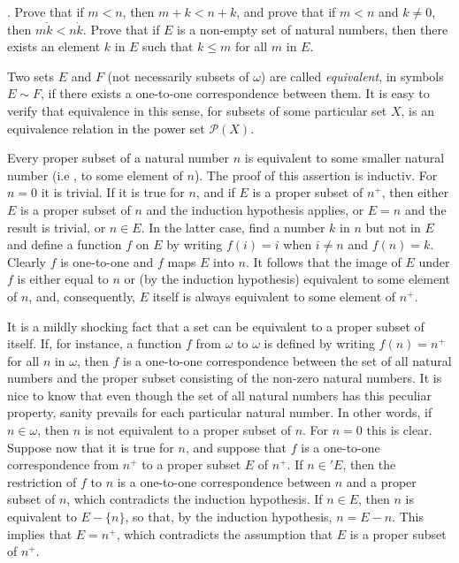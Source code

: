 \begin{exercise}. Prove that if $m < n$, then $m + k < n + k$, and prove that if $m < n$ and $k \neq 0$, then $m \dot k <n \dot k$. Prove that if $E$ is a non-empty set of natural numbers, then there exists an element $k$ in $E$ such that $k \le m$ for all $m$ in $E$. 
\end{exercise}

Two sets $E$ and $F$ (not necessarily subsets of $\omega$) are called \textit{equivalent}, in symbols $E \sim F$, if there exists a one-to-one correspondence between them. It is easy to verify that equivalence in this sense, for subsets of some particular set $X$, is an equivalence relation in the power set $\mathcal{P}(X)$.

Every proper subset of a natural number $n$ is equivalent to some smaller natural number (i.e , to some element of $n$). The proof of this assertion is inductiv. For $n = 0$ it is trivial. If it is true for $n$, and if $E$ is a proper subset of $n^{+}$, then either $E$ is a proper subset of $n$ and the induction hypothesis applies, or $E = n$ and the result is trivial, or $n \in E$. In the latter case, find a number $k$ in $n$ but not in $E$ and define a function $f$ on $E$ by writing $f(i) = i$ when $i \neq n$ and $f(n) = k$. Clearly $f$ is one-to-one and $f$ maps $E$ into $n$. It follows that the image of $E$ under $f$ is either equal to $n$ or (by the induction hypothesis) equivalent to some element of $n$, and, consequently, $E$ itself is always equivalent to some element of $n^{+}$. 

It is a mildly shocking fact that a set can be equivalent to a proper subset of itself. If, for instance, a function $f$ from $\omega$ to $\omega$ is defined by writing $f(n) = n^{+}$ for all $n$ in $\omega$, then $f$ is a one-to-one correspondence between the set of all natural numbers and the proper subset consisting of the non-zero natural numbers. It is nice to know that even though the set of all natural numbers has this peculiar property, sanity prevails for each particular natural number. In other words, if $n \in \omega$, then $n$ is not equivalent to a proper subset of $n$. For $n = 0$ this is clear. Suppose now that it is true for $n$, and suppose that $f$ is a one-to-one correspondence from $n^{+}$ to a proper subset $E$ of $n^{+}$. If $n \in ' E$, then the restriction of $f$ to $n$ is a one-to-one correspondence between $n$ and a proper subset of $n$, which contradicts the induction hypothesis. If $n \in E$, then $n$ is equivalent to $E - \{ n \}$, so that, by the induction hypothesis, $n = E - {n}$. This implies that $E = n^{+}$, which contradicts the assumption that $E$ is a proper subset of $n^{+}$. 

